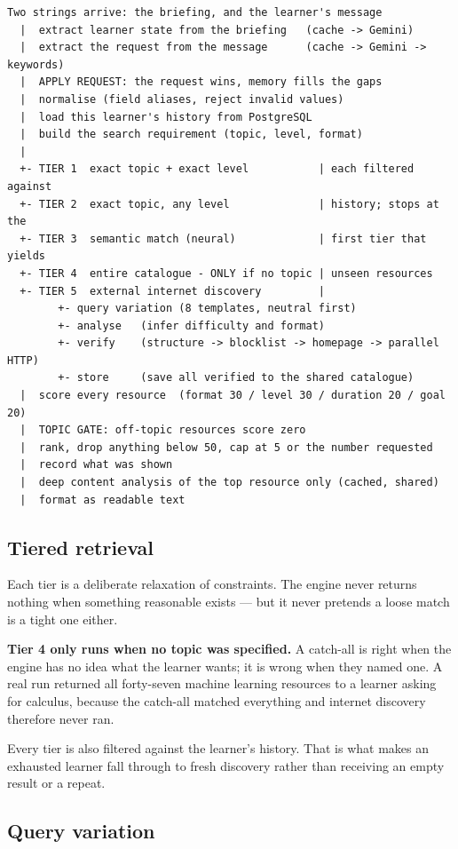 \documentclass[11pt,a4paper]{article}
\begin{document}
\begin{lstlisting}
Two strings arrive: the briefing, and the learner's message
  |  extract learner state from the briefing   (cache -> Gemini)
  |  extract the request from the message      (cache -> Gemini -> keywords)
  |  APPLY REQUEST: the request wins, memory fills the gaps
  |  normalise (field aliases, reject invalid values)
  |  load this learner's history from PostgreSQL
  |  build the search requirement (topic, level, format)
  |
  +- TIER 1  exact topic + exact level           | each filtered against
  +- TIER 2  exact topic, any level              | history; stops at the
  +- TIER 3  semantic match (neural)             | first tier that yields
  +- TIER 4  entire catalogue - ONLY if no topic | unseen resources
  +- TIER 5  external internet discovery         |
        +- query variation (8 templates, neutral first)
        +- analyse   (infer difficulty and format)
        +- verify    (structure -> blocklist -> homepage -> parallel HTTP)
        +- store     (save all verified to the shared catalogue)
  |  score every resource  (format 30 / level 30 / duration 20 / goal 20)
  |  TOPIC GATE: off-topic resources score zero
  |  rank, drop anything below 50, cap at 5 or the number requested
  |  record what was shown
  |  deep content analysis of the top resource only (cached, shared)
  |  format as readable text
\end{lstlisting}

\subsection{Tiered retrieval}

Each tier is a deliberate relaxation of constraints. The engine never returns
nothing when something reasonable exists --- but it never pretends a loose
match is a tight one either.

\textbf{Tier 4 only runs when no topic was specified.} A catch-all is right
when the engine has no idea what the learner wants; it is wrong when they
named one. A real run returned all forty-seven machine learning resources to a
learner asking for calculus, because the catch-all matched everything and
internet discovery therefore never ran.

Every tier is also filtered against the learner's history. That is what makes
an exhausted learner fall through to fresh discovery rather than receiving an
empty result or a repeat.

\subsection{Query variation}
\end{document}
